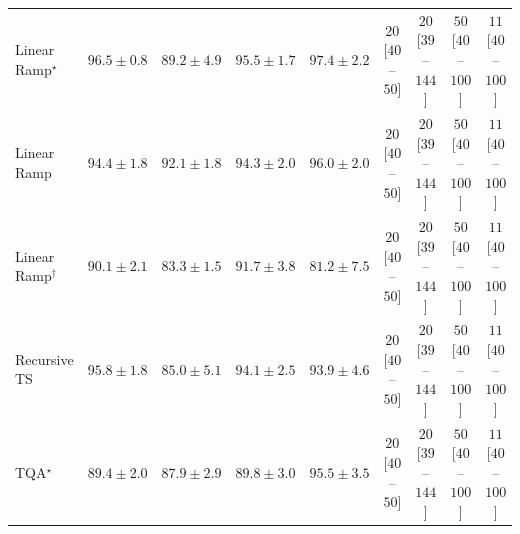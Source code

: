 \begin{tabular}{l|cccc|cccc|}
Linear Ramp$^\star$ & {\cellcolor[HTML]{6E096A}} \color[HTML]{F1F1F1} $96.5\pm 0.8$ & {\cellcolor[HTML]{8B60AC}} \color[HTML]{F1F1F1} $89.2\pm 4.9$ & {\cellcolor[HTML]{7C0E78}} \color[HTML]{F1F1F1} $95.5\pm 1.7$ & {\cellcolor[HTML]{5F055C}} \color[HTML]{F1F1F1} $97.4\pm 2.2$ & {\cellcolor[HTML]{FDE4E1}} \color[HTML]{000000} $20$ [$40$--$50$] & {\cellcolor[HTML]{FDE4E1}} \color[HTML]{000000} $20$ [$39$--$144$] & {\cellcolor[HTML]{FCC0BF}} \color[HTML]{000000} $50$ [$40$--$100$] & {\cellcolor[HTML]{FEEEEA}} \color[HTML]{000000} $11$ [$40$--$100$] \\
Linear Ramp & {\cellcolor[HTML]{831A83}} \color[HTML]{F1F1F1} $94.4\pm 1.8$ & {\cellcolor[HTML]{873B99}} \color[HTML]{F1F1F1} $92.1\pm 1.8$ & {\cellcolor[HTML]{831C84}} \color[HTML]{F1F1F1} $94.3\pm 2.0$ & {\cellcolor[HTML]{740B70}} \color[HTML]{F1F1F1} $96.0\pm 2.0$ & {\cellcolor[HTML]{FDE4E1}} \color[HTML]{000000} $20$ [$40$--$50$] & {\cellcolor[HTML]{FDE4E1}} \color[HTML]{000000} $20$ [$39$--$144$] & {\cellcolor[HTML]{FCC0BF}} \color[HTML]{000000} $50$ [$40$--$100$] & {\cellcolor[HTML]{FEEEEA}} \color[HTML]{000000} $11$ [$40$--$100$] \\
Linear Ramp$^\dagger$ & {\cellcolor[HTML]{8A54A6}} \color[HTML]{F1F1F1} $90.1\pm 2.1$ & {\cellcolor[HTML]{94A6CE}} \color[HTML]{F1F1F1} $83.3\pm 1.5$ & {\cellcolor[HTML]{88419D}} \color[HTML]{F1F1F1} $91.7\pm 3.8$ & {\cellcolor[HTML]{9FBCDA}} \color[HTML]{000000} $81.2\pm 7.5$ & {\cellcolor[HTML]{FDE4E1}} \color[HTML]{000000} $20$ [$40$--$50$] & {\cellcolor[HTML]{FDE4E1}} \color[HTML]{000000} $20$ [$39$--$144$] & {\cellcolor[HTML]{FCC0BF}} \color[HTML]{000000} $50$ [$40$--$100$] & {\cellcolor[HTML]{FEEEEA}} \color[HTML]{000000} $11$ [$40$--$100$] \\
Recursive TS & {\cellcolor[HTML]{770C73}} \color[HTML]{F1F1F1} $95.8\pm 1.8$ & {\cellcolor[HTML]{8C93C4}} \color[HTML]{F1F1F1} $85.0\pm 5.1$ & {\cellcolor[HTML]{831F86}} \color[HTML]{F1F1F1} $94.1\pm 2.5$ & {\cellcolor[HTML]{842289}} \color[HTML]{F1F1F1} $93.9\pm 4.6$ & {\cellcolor[HTML]{FDE4E1}} \color[HTML]{000000} $20$ [$40$--$50$] & {\cellcolor[HTML]{FDE4E1}} \color[HTML]{000000} $20$ [$39$--$144$] & {\cellcolor[HTML]{FCC0BF}} \color[HTML]{000000} $50$ [$40$--$100$] & {\cellcolor[HTML]{FEEEEA}} \color[HTML]{000000} $11$ [$40$--$100$] \\
TQA$^\star$ & {\cellcolor[HTML]{8B5DAA}} \color[HTML]{F1F1F1} $89.4\pm 2.0$ & {\cellcolor[HTML]{8C70B3}} \color[HTML]{F1F1F1} $87.9\pm 2.9$ & {\cellcolor[HTML]{8A58A8}} \color[HTML]{F1F1F1} $89.8\pm 3.0$ & {\cellcolor[HTML]{7C0E78}} \color[HTML]{F1F1F1} $95.5\pm 3.5$ & {\cellcolor[HTML]{FDE4E1}} \color[HTML]{000000} $20$ [$40$--$50$] & {\cellcolor[HTML]{FDE4E1}} \color[HTML]{000000} $20$ [$39$--$144$] & {\cellcolor[HTML]{FCC0BF}} \color[HTML]{000000} $50$ [$40$--$100$] & {\cellcolor[HTML]{FEEEEA}} \color[HTML]{000000} $11$ [$40$--$100$] \\

\end{tabular}
